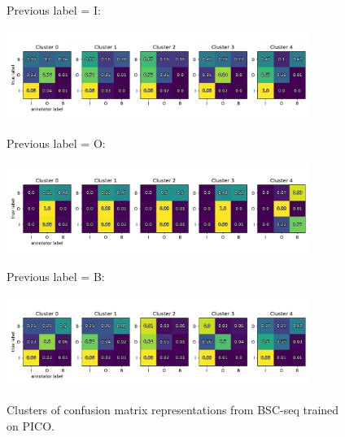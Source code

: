 \begin{figure}[h]
\begin{minipage}[b][0.5cm][b]{0.1\textwidth} 
Previous label = I:\\
\vspace{1cm}
\end{minipage}
  \includegraphics[width=0.88\textwidth, clip=True, trim=10 20 10 28]{figures/worker_models/seq_prev0_heatmap}
\vspace{0.2cm}
\\
\begin{minipage}[b][0.5cm][b]{0.1\textwidth} 
Previous label = O:\\
\vspace{1cm}
\end{minipage}
  \includegraphics[width=0.88\textwidth, clip=True, trim=10 20 10 50]{figures/worker_models/seq_prev1_heatmap}
\vspace{0.2cm}
\\
\begin{minipage}[b][0.5cm][b]{0.1\textwidth} 
Previous label = B:\\
\vspace{1cm}
\end{minipage}
  \includegraphics[width=0.88\textwidth, clip=True, trim=10 20 10 50]{figures/worker_models/seq_prev2_heatmap}
\\
\caption{Clusters of confusion matrix representations from BSC-seq trained on PICO. 
}
\label{fig:conf_mat_clusters}
\end{figure}

